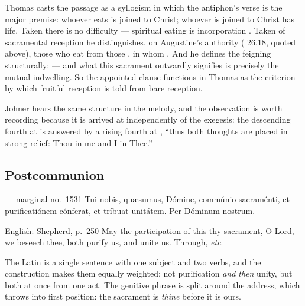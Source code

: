 \begin{witnessnote}
Thomas casts the passage as a syllogism in which the antiphon's verse is the
major premise: whoever eats is joined to Christ; whoever is joined to Christ
has life. Taken  there is no difficulty --- spiritual eating is
incorporation . Taken of sacramental
reception he distinguishes, on Augustine's authority (
26.18, quoted above), those who eat  from those , in whom
. And he defines the
feigning structurally:  --- and what this sacrament outwardly signifies is precisely
the mutual indwelling. So the appointed clause functions in Thomas as the
criterion by which fruitful reception is told from bare reception.
\end{witnessnote}

Johner hears the same structure in the melody, and the observation is worth
recording because it is arrived at independently of the exegesis: the
descending fourth at  is answered by a rising fourth at
, ``thus both thoughts are placed in strong relief: Thou in me
and I in Thee.''

\subsection*{Postcommunion }

\begin{appointedlatin}{ --- marginal no.\ 1531}
Tui nobis, quæsumus, Dómine, commúnio sacraménti, et purificatiónem cónferat,
et tríbuat unitátem. Per Dóminum nostrum.
\end{appointedlatin}

\begin{namedtranslation}{English: Shepherd, p.~250}
May the participation of this thy sacrament, O Lord, we beseech thee, both
purify us, and unite us. Through, \textit{etc}.
\end{namedtranslation}

The Latin is a single sentence with one subject and two verbs, and the
 construction makes them equally weighted: not purification
\textit{and then} unity, but both at once from one act. The genitive phrase
 is split around the address, which throws
 into first position: the sacrament is \textit{thine} before it is
ours.

